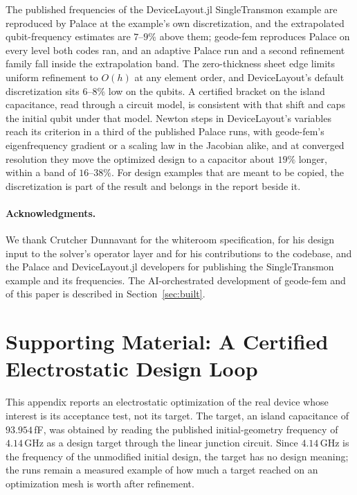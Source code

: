 \documentclass{anvil-paper}
\begin{document}
The published frequencies of the DeviceLayout.jl SingleTransmon example
are reproduced by Palace at the example's own discretization, and the
extrapolated qubit-frequency estimates are $7$--$9\%$ above them; geode-fem
reproduces Palace on every level both codes ran, and an adaptive Palace run
and a second refinement family fall inside the extrapolation band. The
zero-thickness sheet edge limits uniform refinement to $O(h)$ at any element
order, and DeviceLayout's default discretization sits $6$--$8\%$ low on the
qubits. A certified bracket on the island capacitance, read through a
circuit model, is consistent with that shift and caps the initial qubit
under that model. Newton steps in DeviceLayout's variables reach its
criterion in a third of the published Palace runs, with geode-fem's
eigenfrequency gradient or a scaling law in the Jacobian alike, and at
converged resolution they move the optimized design to a capacitor about
$19\%$ longer, within a band of $16$--$38\%$. For design examples that are
meant to be copied, the discretization is part of the result and belongs
in the report beside it.

\paragraph{Acknowledgments.}
We thank Crutcher Dunnavant for the whiteroom specification, for his
design input to the solver's operator layer and for his contributions to
the codebase, and the Palace and
DeviceLayout.jl developers for publishing the SingleTransmon example and
its frequencies. The AI-orchestrated development of geode-fem and of this
paper is described in Section~\ref{sec:built}.

\clearpage
\appendix
\section{Supporting Material: A Certified Electrostatic Design Loop}
\label{sec:appendix-supporting}

This appendix reports an electrostatic optimization of the real device
whose interest is its acceptance test, not its target. The target, an
island capacitance of $93.954$\,fF, was obtained by reading the published
initial-geometry frequency of $4.14$\,GHz as a design target through the
linear junction circuit. Since $4.14$\,GHz is the frequency of the
unmodified initial design, the target has no design meaning; the runs
remain a measured example of how much a target reached on an
optimization mesh is worth after refinement.
\end{document}
